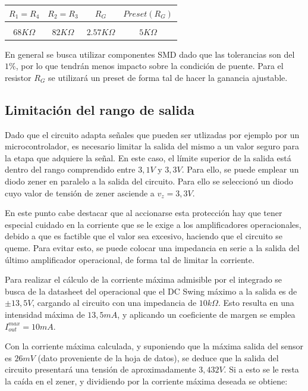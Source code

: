\begin{table}[H]
    \centering
    \begin{tabular}{c c c c}
        $R_1 = R_4$ & $R_2 = R_3$ & $R_G$ & $Preset (R_G)$  \\
        \hline \\
        $68 K\Omega$ & $82 K\Omega$ & $2.57 K\Omega$ & $5 K\Omega$ \\
        \hline
    \end{tabular}
\end{table}

En general se busca utilizar componentes SMD dado que las tolerancias son del $1\%$, por lo que tendr\'an menos impacto sobre la condici\'on de puente. Para el resistor $R_G$ se utilizar\'a un preset de forma tal de hacer la ganancia ajustable.

\subsection{Limitaci\'on del rango de salida}

Dado que el circuito adapta se\~nales que pueden ser utlizadas por ejemplo por un microcontrolador, es necesario limitar la salida del mismo a un valor seguro para la etapa que adquiere la se\~nal. En este caso, el l\'imite superior de la salida est\'a dentro del rango comprendido entre $3,1V$ y $3,3V$. Para ello, se puede emplear un diodo zener en paralelo a la salida del circuito. Para ello se seleccion\'o un diodo cuyo valor de tensi\'on de zener asciende a $v_z = 3,3V$.


En este punto cabe destacar que al accionarse esta protecci\'on hay que tener especial cuidado en la corriente que se le exige a los amplificadores operacionales, debido a que es factible que el valor sea excesivo, haciendo que el circuito se queme. Para evitar esto, se puede colocar una impedancia en serie a la salida del \'ultimo amplificador operacional, de forma tal de limitar la corriente.


Para realizar el c\'alculo de la corriente m\'axima admisible por el integrado se busca de la datasheet del operacional que el DC Swing m\'aximo a la salida es de $\pm 13,5V$, cargando al circuito con una impedancia de $10k\Omega$. Esto resulta en una intensidad m\'axima de $13,5mA$, y aplicando un coeficiente de margen se emplea $I_{out}^{max} = 10mA$.

Con la corriente m\'axima calculada, y suponiendo que la m\'axima salida del sensor es $26mV$ (dato proveniente de la hoja de datos), se deduce que la salida del circuito presentar\'a una tensi\'on de aproximadamente $3,432V$. Si a esto se le resta la ca\'ida en el zener, y dividiendo por la corriente m\'axima deseada se obtiene:


